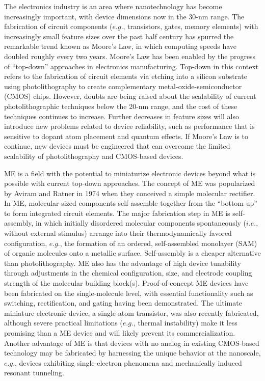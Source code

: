 \documentclass[10pt]{report}  %
\begin{document}
The electronics industry is an area where nanotechnology has become increasingly important, with device dimensions now in the 30-nm range. \cite{ITRS:2012}  The fabrication of circuit components ($e.g.$, transistors, gates, memory elements) with increasingly small feature sizes over the past half century has spurred the remarkable trend known as Moore's Law,\cite{Moore:1965} in which computing speeds have doubled roughly every two years.  Moore's Law has been enabled by the progress of ``top-down'' approaches in electronics manufacturing.  Top-down in this context refers to the fabrication of circuit elements via etching into a silicon substrate using photolithography to create complementary metal-oxide-semiconductor (CMOS) chips.  However, doubts are being raised about the scalability of current photolithographic techniques below the 20-nm range, and the cost of these techniques continues to increase.\cite{Vuillaume:2008} Further decreases in feature sizes will also introduce new problems related to device reliability, such as performance that is sensitive to dopant atom placement \cite{Roy:2005,Shinada:2005} and quantum effects.\cite{Zhirnov:2003} If Moore's Law is to continue, new devices must be engineered that can overcome the limited scalability of photolithography and CMOS-based devices.  


ME is a field with the potential to miniaturize electronic devices beyond what is possible with current top-down approaches.\cite{Nitzan:2003,Heath:2003,Tao:2006,McCreery:2009,Nichols:2010} The concept of ME was popularized by Aviram and Ratner in 1974 when they conceived a simple molecular rectifier.\cite{Aviram:1974} In ME, molecular-sized components self-assemble together from the ``bottom-up'' to form integrated circuit elements. The major fabrication step in ME is self-assembly, in which initially disordered molecular components spontaneously ($i.e.$, without external stimulus) arrange into their thermodynamically favored configuration, $e.g.$, the formation of an ordered, self-assembled monolayer (SAM)  of organic molecules onto a metallic surface. \cite{Ulman:1996,Xu:1998,Love:2005,Vericat:2010} Self-assembly is a cheaper alternative than photolithography. ME also has the advantage of high device tunability through adjustments in the chemical configuration, size, and electrode coupling strength of the molecular building block(s). Proof-of-concept ME devices have been fabricated on the single-molecule level, with essential functionality such as switching,\cite{Venkataraman:2006} rectification,\cite{Diez-Perez:2009} and gating \cite{Song:2009} having been demonstrated. The ultimate miniature electronic device, a single-atom transistor, was also recently fabricated, \cite{Fuechsle:2012} although severe practical limitations ($e.g.$, thermal instability) make it less promising than a ME device and will likely prevent its commercialization. Another advantage of ME is that devices with no analog in existing CMOS-based technology may be fabricated by harnessing the unique behavior at the nanoscale, $e.g.$, devices exhibiting single-electron phenomena \cite{Park:2002} and mechanically induced resonant tunneling. \cite{Bruot:2012} 
\end{document}
